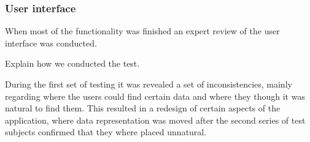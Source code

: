 \subsubsection{User interface}
When most of the functionality was finished an expert review of the user interface was conducted.

Explain how we conducted the test.

During the first set of testing it was revealed a set of inconsistencies, mainly regarding where the users could find certain data and where they though it was natural to find them. 
This resulted in a redesign of certain aspects of the application, where data representation was moved after the second series of test subjects confirmed that they where placed unnatural.